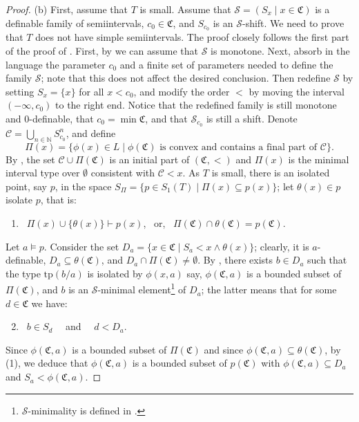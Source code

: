 \documentclass{amsart}
\theoremstyle{definition}
\theoremstyle{definition}
\newcommand{\Mon}{\mathfrak C}
\newcommand{\tp}{\mathrm{tp}}
\begin{document}
\begin{proof}
(b) First, assume that $T$ is small. Assume that $\mathcal S=(S_x\mid x\in\Mon)$ is a definable family of semiintervals, $c_0\in\Mon$, and $S_{c_0}$ is an $\mathcal S$-shift. We need to prove that $T$ does not have simple semiintervals. 
The proof closely follows the first part of the proof of \cite[Theorem 1]{MTwqom1}. 
First, by \cite[Lemma 6.7]{MTwqom1} we can assume that $\mathcal S$ is monotone. Next, absorb in the language the parameter $c_0$ and a finite set of parameters needed to define the family $\mathcal S$; note that this does not affect the desired conclusion. Then redefine $\mathcal S$ by setting $S_x=\{x\}$ for all $x<c_0$, and modify the order $<$ by moving the interval $(-\infty, c_0)$ to the right end. Notice that the redefined family is still monotone and $0$-definable, that $c_0=\min \Mon$, and that $\mathcal S_{c_0}$ is still a shift. 
Denote $\mathcal C=\bigcup_{n\in\mathbb N} S_{c_0}^n$, and define
 \[\Pi(x)=\{\phi(x)\in L\mid \phi(\Mon)\text{ is convex and contains a final part of }\mathcal C\}.\] 
By \cite[Lemma 6.9(b,c)]{MTwqom1}, the set $\mathcal C\cup\Pi(\Mon)$ is an initial part of $(\Mon,<)$ and $\Pi(x)$ is the minimal interval type over $\emptyset$ consistent with $\mathcal C<x$. As $T$ is small, there is an isolated point, say $p$, in the space $S_\Pi=\{p\in S_1(T)\mid \Pi(x)\subseteq p(x)\}$; let $\theta(x)\in p$ isolate $p$, that is:
\begin{enumerate}[(1)]
    \item \ $\Pi(x)\cup\{\theta(x)\}\vdash p(x)$, \ or, \ $\Pi(\Mon)\cap \theta(\Mon)=p(\Mon)$. 
\end{enumerate} 
Let $a\models p$. Consider the set $D_a=\{x\in \Mon\mid S_a<x\land\theta(x)\}$; clearly, it is $a$-definable, $D_a\subseteq \theta(\Mon)$, and $D_a\cap \Pi(\Mon)\neq \emptyset$. By \cite[Lemma 6.12(b,c)]{MTwqom1}, there exists $b\in D_a$ such that the type $\tp(b/a)$ is isolated by $\phi(x,a)$ say, $\phi(\Mon,a)$ is a bounded subset of $\Pi(\Mon)$, and $b$ is an $\mathcal S$-minimal element\footnote{$\mathcal S$-minimality is defined in \cite[Definition 6.11]{MTwqom1}.} of $D_a$; the latter means that for some $d\in \Mon$ we have: 
\begin{enumerate}[(1)]
\setcounter{enumi}{1}
    \item  \ $b\in S_d$  \ \  and \ \ $d<D_a$. 
\end{enumerate} 
Since $\phi(\Mon,a)$ is a bounded subset of $\Pi(\Mon)$ and since $\phi(\Mon,a)\subseteq \theta(\Mon)$, by (1), we deduce that $\phi(\Mon,a)$ is a bounded subset of $p(\Mon)$ with $\phi(\Mon,a)\subseteq D_a$ and $S_a<\phi(\Mon,a)$.  



\end{proof}
\end{document}
